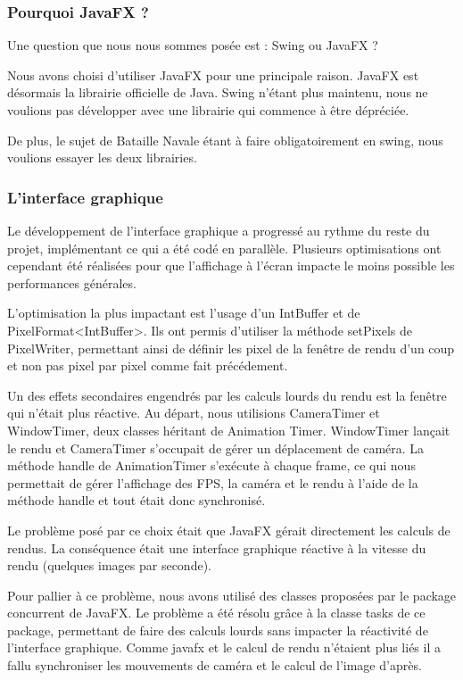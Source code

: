 \subsubsection{Pourquoi JavaFX ?}

Une question que nous nous sommes posée est : Swing ou JavaFX ?

Nous avons choisi d'utiliser JavaFX pour une principale raison. JavaFX est désormais la librairie officielle de Java. Swing n'étant plus maintenu, nous ne voulions pas développer avec une librairie qui commence à être dépréciée.

De plus, le sujet de Bataille Navale étant à faire obligatoirement en swing, nous voulions essayer les deux librairies.


\subsubsection{L'interface graphique}

Le développement de l'interface graphique a progressé au rythme du reste du projet, implémentant ce qui a été codé en parallèle. Plusieurs optimisations ont cependant été réalisées pour que l'affichage à l'écran impacte le moins possible les performances générales.

L'optimisation la plus impactant est l'usage d'un IntBuffer et de PixelFormat<IntBuffer>. Ils ont permis d'utiliser la méthode setPixels de PixelWriter, permettant ainsi de définir les pixel de la fenêtre de rendu d'un coup et non pas pixel par pixel comme fait précédement.

Un des effets secondaires engendrés par les calculs lourds du rendu est la fenêtre qui n'était plus réactive.
Au départ, nous utilisions CameraTimer et WindowTimer, deux classes héritant de Animation Timer. WindowTimer lançait le rendu et CameraTimer s'occupait de gérer un déplacement de caméra. La méthode handle de AnimationTimer s'exécute à chaque frame, ce qui nous permettait de gérer l'affichage des FPS, la caméra et le rendu à l'aide de la méthode handle et tout était donc synchronisé.

Le problème posé par ce choix était que JavaFX gérait directement les calculs de rendus. La conséquence était une interface graphique réactive à la vitesse du rendu (quelques images par seconde).

\label{UsageTask}

Pour pallier à ce problème, nous avons utilisé des classes proposées par le package concurrent de JavaFX. Le problème a été résolu grâce à la classe tasks de ce package, permettant de faire des calculs lourds sans impacter la réactivité de l'interface graphique. Comme javafx et le calcul de rendu n'étaient plus liés il a fallu synchroniser les mouvements de caméra et le calcul de l'image d'après.



